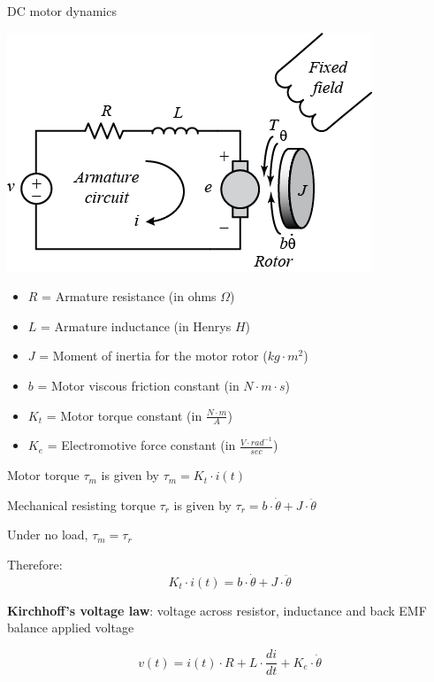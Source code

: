 \documentclass[compress]{beamer}
\begin{document}
\begin{frame}{DC motor dynamics}

    \begin{center}
        \includegraphics[width=0.5\linewidth]{image63}
    \end{center}

 {
\begin{itemize}

\item $R$ = Armature resistance (in ohms $\Omega$)
\item $L$ = Armature inductance (in Henrys $H$) %
\item $J$ = Moment of inertia for the motor rotor ($kg\cdot m^2$)
\item $b$ = Motor viscous friction constant (in $N\cdot m\cdot s$)
\item $K_t$ = Motor torque constant (in $\frac{N\cdot m}{A}$)
\item $K_e$ = Electromotive force constant (in $\frac{V\cdot rad^{-1}}{sec}$) %
\end{itemize}
}

     {
    Motor torque $\tau_m$ is given by $\tau_m = K_t \cdot i(t)$

Mechanical resisting torque $\tau_r$ is given by $\tau_r = b \cdot \dot\theta + J \cdot \ddot\theta$

Under no load, $\tau_m = \tau_r$

Therefore:
\[
    K_t \cdot i(t) = b \cdot \dot\theta + J \cdot \ddot\theta
\]

}
     {

\textbf{Kirchhoff's voltage law}: voltage across resistor, inductance and
back EMF balance applied voltage

    \[
        v(t) = i(t) \cdot R + L \cdot \frac{di}{dt} + K_e \cdot \dot\theta
    \]
}
\end{frame}
\end{document}
